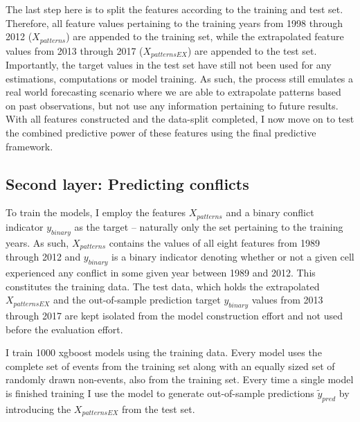 \documentclass[a4paper]{article}
\begin{document}
The last step here is to split the features according to the training and test set. Therefore, all feature values pertaining to the training years from 1998 through 2012 ($X_{patterns}$) are appended to the training set, while the extrapolated feature values from 2013 through 2017 ($X_{patternsEX}$) are appended to the test set. Importantly, the target values in the test set have still not been used for any estimations, computations or model training. As such, the process still emulates a real world forecasting scenario where we are able to extrapolate patterns based on past observations, but not use any information pertaining to future results. With all features constructed and the data-split completed, I now move on to test the combined predictive power of these features using the final predictive framework.\par

\subsection{Second layer: Predicting conflicts}


To train the models, I employ the features $X_{patterns}$ and a binary conflict indicator $y_{binary}$ as the target -- naturally only the set pertaining to the training years. As such, $X_{patterns}$ contains the values of all eight features from 1989 through 2012 and $y_{binary}$ is a binary indicator denoting whether or not a given cell experienced any conflict in some given year between 1989 and 2012. This constitutes the training data. The test data, which holds the extrapolated $X_{patternsEX}$ and the out-of-sample prediction target $y_{binary}$ values from 2013 through 2017 are kept isolated from the model construction effort and not used before the evaluation effort.\par

I train 1000 xgboost models using the training data. Every model uses the complete set of events from the training set along with an equally sized set of randomly drawn non-events, also from the training set. Every time a single model is finished training I use the model to generate out-of-sample predictions $\tilde{y}_{pred}$ by introducing the $X_{patternsEX}$ from the test set.\par
\end{document}
